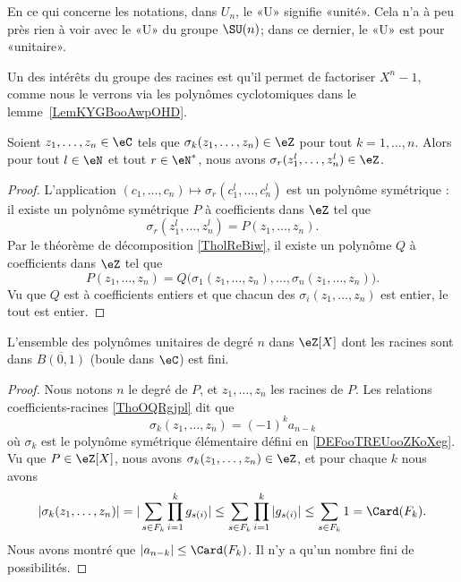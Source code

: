 \begin{normaltext}
	En ce qui concerne les notations, dans \( U_n\), le «U» signifie «unité». Cela n'a à peu près rien à voir avec le «U» du groupe \( \SU(n)\); dans ce dernier, le «U» est pour «unitaire».
\end{normaltext}

Un des intérêts du groupe des racines est qu'il permet de factoriser \( X^n-1\), comme nous le verrons via les polynômes cyclotomiques dans le lemme~\ref{LemKYGBooAwpOHD}.

\begin{lemma}	\label{LEMooRQRYooWZAuSD}
	Soient \( z_1,\ldots,z_n\in \eC\) tels que \( \sigma_k(z_1,\ldots,z_n)\in \eZ\) pour tout \( k=1,\ldots,n\). Alors pour tout \( l\in \eN\) et tout \( r\in \eN^*\), nous avons \( \sigma_r(z_1^l,\ldots,z_n^l)\in \eZ\).
\end{lemma}

\begin{proof}
	L'application \( (c_1,\ldots,c_n)\mapsto \sigma_r(c_1^l,\ldots, c_n^l)\) est un polynôme symétrique : il existe un polynôme symétrique \( P\) à coefficients dans \( \eZ\) tel que
	\begin{equation}
		\sigma_r(z_1^l,\ldots,z_n^l)=P(z_1,\ldots,z_n).
	\end{equation}
	Par le théorème de décomposition \ref{TholReBiw}, il existe un polynôme \( Q\) à coefficients dans \( \eZ\) tel que
	\begin{equation}
		P(z_1,\ldots,z_n)=Q\big( \sigma_1(z_1,\ldots,z_n),\ldots,\sigma_n(z_1,\ldots,z_n) \big).
	\end{equation}
	Vu que \( Q\) est à coefficients entiers et que chacun des \( \sigma_i(z_1,\ldots,z_n)\) est entier, le tout est entier.
\end{proof}

\begin{lemma}	\label{LEMooDJQFooOhVoPj}
	L'ensemble des polynômes unitaires de degré \( n\) dans \( \eZ[X]\) dont les racines sont dans \( \overline{B(0,1)}\) (boule dans \( \eC\)) est fini.
\end{lemma}

\begin{proof}
	Nous notons \( n\) le degré de \( P\), et \( z_1,\ldots,z_n\) les racines de \( P\). Les relations coefficients-racines \ref{ThoOQRgjpl} dit que
	\begin{equation}
		\sigma_k(z_1,\ldots,z_n)=(-1)^ka_{n-k}
	\end{equation}
	où \( \sigma_k\) est le polynôme symétrique élémentaire défini en \ref{DEFooTREUooZKoXeg}. Vu que \( P\in \eZ[X]\), nous avons \( \sigma_k(z_1,\ldots,z_n)\in \eZ\), et pour chaque \( k\) nous avons
	\begin{equation}
		| \sigma_k(z_1,\ldots,z_n) |=| \sum_{s\in F_k}\prod_{i=1}^kg_{s(i)} |\leq \sum_{s\in F_k}\prod_{i=1}^k| g_{s(i)} |\leq \sum_{s\in F_k}1=\Card(F_k).
	\end{equation}
	Nous avons montré que \( | a_{n-k} |\leq \Card(F_k)\). Il n'y a qu'un nombre fini de possibilités.
\end{proof}

